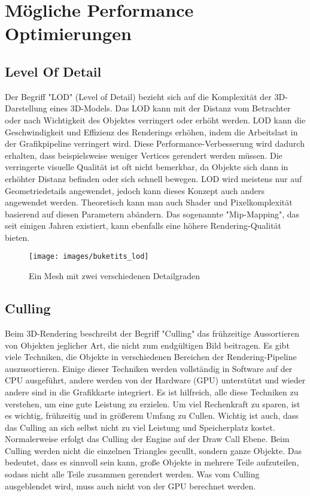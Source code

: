 \chapter{Mögliche Performance Optimierungen} \label{simon_performance}
\section{Level Of Detail}
Der Begriff "LOD" (Level of Detail) bezieht sich auf die Komplexität der 3D-Darstellung eines 3D-Models. Das LOD kann mit der Distanz vom Betrachter oder nach Wichtigkeit des Objektes verringert oder erhöht werden. LOD kann die Geschwindigkeit und Effizienz des Renderings erhöhen, indem die Arbeitslast in der Grafikpipeline verringert wird. Diese Performance-Verbesserung wird dadurch erhalten, dass beispielsweise weniger Vertices gerendert werden müssen. Die verringerte visuelle Qualität ist oft nicht bemerkbar, da Objekte sich dann in erhöhter Distanz befinden oder sich schnell bewegen. LOD wird meistens nur auf Geometriedetails angewendet, jedoch kann dieses Konzept auch anders angewendet werden. Theoretisch kann man auch Shader und Pixelkomplexität basierend auf diesen Parametern abändern. Das sogenannte "Mip-Mapping", das seit einigen Jahren existiert, kann ebenfalls eine höhere Rendering-Qualität bieten.
\cite{_lod_formeshes}

\begin{figure}[H]
	\centering
	\texttt{[image: images/buketits\_lod]}
	\caption{Ein Mesh mit zwei verschiedenen Detailgraden\cite{_lod_formeshes}}
\end{figure}


\section{Culling}
Beim 3D-Rendering beschreibt der Begriff "Culling" das frühzeitige Aussortieren von Objekten jeglicher Art, die nicht zum endgültigen Bild beitragen. Es gibt viele Techniken, die Objekte in verschiedenen Bereichen der Rendering-Pipeline auszusortieren. Einige dieser Techniken werden vollständig in Software auf der CPU ausgeführt, andere werden von der Hardware (GPU) unterstützt und wieder andere sind in die Grafikkarte integriert. Es ist hilfreich, alle diese Techniken zu verstehen, um eine gute Leistung zu erzielen. Um viel Rechenkraft zu sparen, ist es wichtig, frühzeitig und in größerem Umfang zu Cullen. Wichtig ist auch, dass das Culling an sich selbst nicht zu viel Leistung und Speicherplatz kostet.
\cite{_cryengine_culling}
Normalerweise erfolgt das Culling der Engine auf der Draw Call Ebene. Beim Culling werden nicht die einzelnen Triangles gecullt, sondern ganze Objekte. Das bedeutet, dass es sinnvoll sein kann, große Objekte in mehrere Teile aufzuteilen, sodass nicht alle Teile zusammen gerendert werden.\cite{_cryengine_culling}
Was vom Culling ausgeblendet wird, muss auch nicht von der GPU berechnet werden.
\cite{_cryengine_culling}

